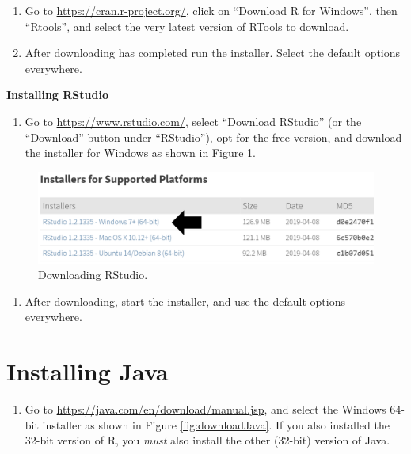 \documentclass[11pt]{book}
\providecommand{\tightlist}{%
  \setlength{\itemsep}{0pt}\setlength{\parskip}{0pt}}
\begin{document}
\begin{enumerate}
\def\labelenumi{\arabic{enumi}.}
\item
  Go to \url{https://cran.r-project.org/}, click on ``Download R for
  Windows'', then ``Rtools'', and select the very latest version of
  RTools to download.
\item
  After downloading has completed run the installer. Select the default
  options everywhere.
\end{enumerate}

\textbf{Installing RStudio}

\begin{enumerate}
\def\labelenumi{\arabic{enumi}.}
\tightlist
\item
  Go to \url{https://www.rstudio.com/}, select ``Download RStudio'' (or
  the ``Download'' button under ``RStudio''), opt for the free version,
  and download the installer for Windows as shown in Figure
  \ref{fig:downloadRStudio}.
\end{enumerate}

\begin{figure}

{\centering \includegraphics[width=1\linewidth]{images/OhdsiAnalyticsTools/downloadRStudio} 

}

\caption{Downloading RStudio.}\label{fig:downloadRStudio}
\end{figure}

\begin{enumerate}
\def\labelenumi{\arabic{enumi}.}
\setcounter{enumi}{1}
\tightlist
\item
  After downloading, start the installer, and use the default options
  everywhere.
\end{enumerate}

\section{Installing Java}\label{installing-java}

\begin{enumerate}
\def\labelenumi{\arabic{enumi}.}
\tightlist
\item
  Go to \url{https://java.com/en/download/manual.jsp}, and select the
  Windows 64-bit installer as shown in Figure \ref{fig:downloadJava}. If
  you also installed the 32-bit version of R, you \emph{must} also
  install the other (32-bit) version of Java.
\end{enumerate}
\end{document}
